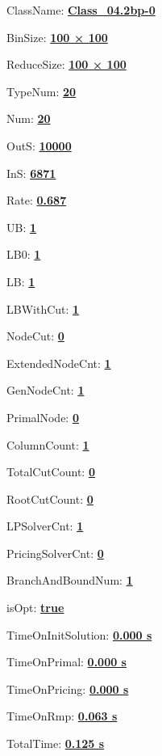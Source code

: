 \documentclass[11pt]{article}
\begin{document}
\pagestyle{empty}


ClassName: \underline{\textbf{Class_04.2bp-0}}
\par
BinSize: \underline{\textbf{100 × 100}}
\par
ReduceSize: \underline{\textbf{100 × 100}}
\par
TypeNum: \underline{\textbf{20}}
\par
Num: \underline{\textbf{20}}
\par
OutS: \underline{\textbf{10000}}
\par
InS: \underline{\textbf{6871}}
\par
Rate: \underline{\textbf{0.687}}
\par
UB: \underline{\textbf{1}}
\par
LB0: \underline{\textbf{1}}
\par
LB: \underline{\textbf{1}}
\par
LBWithCut: \underline{\textbf{1}}
\par
NodeCut: \underline{\textbf{0}}
\par
ExtendedNodeCnt: \underline{\textbf{1}}
\par
GenNodeCnt: \underline{\textbf{1}}
\par
PrimalNode: \underline{\textbf{0}}
\par
ColumnCount: \underline{\textbf{1}}
\par
TotalCutCount: \underline{\textbf{0}}
\par
RootCutCount: \underline{\textbf{0}}
\par
LPSolverCnt: \underline{\textbf{1}}
\par
PricingSolverCnt: \underline{\textbf{0}}
\par
BranchAndBoundNum: \underline{\textbf{1}}
\par
isOpt: \underline{\textbf{true}}
\par
TimeOnInitSolution: \underline{\textbf{0.000 s}}
\par
TimeOnPrimal: \underline{\textbf{0.000 s}}
\par
TimeOnPricing: \underline{\textbf{0.000 s}}
\par
TimeOnRmp: \underline{\textbf{0.063 s}}
\par
TotalTime: \underline{\textbf{0.125 s}}
\par
\newpage
\end{document}
